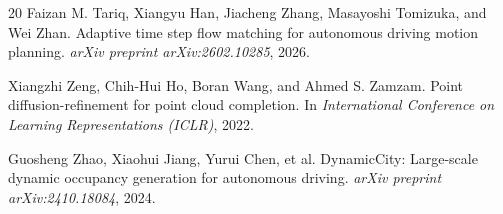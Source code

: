 \documentclass{article}
\begin{document}
\begin{thebibliography}{20}
Faizan M. Tariq, Xiangyu Han, Jiacheng Zhang, Masayoshi Tomizuka, and Wei Zhan.
\newblock Adaptive time step flow matching for autonomous driving motion planning.
\newblock \emph{arXiv preprint arXiv:2602.10285}, 2026.

Xiangzhi Zeng, Chih-Hui Ho, Boran Wang, and Ahmed S. Zamzam.
\newblock Point diffusion-refinement for point cloud completion.
\newblock In \emph{International Conference on Learning Representations (ICLR)}, 2022.

Guosheng Zhao, Xiaohui Jiang, Yurui Chen, et al.
\newblock DynamicCity: Large-scale dynamic occupancy generation for autonomous driving.
\newblock \emph{arXiv preprint arXiv:2410.18084}, 2024.

\end{thebibliography}
\end{document}
